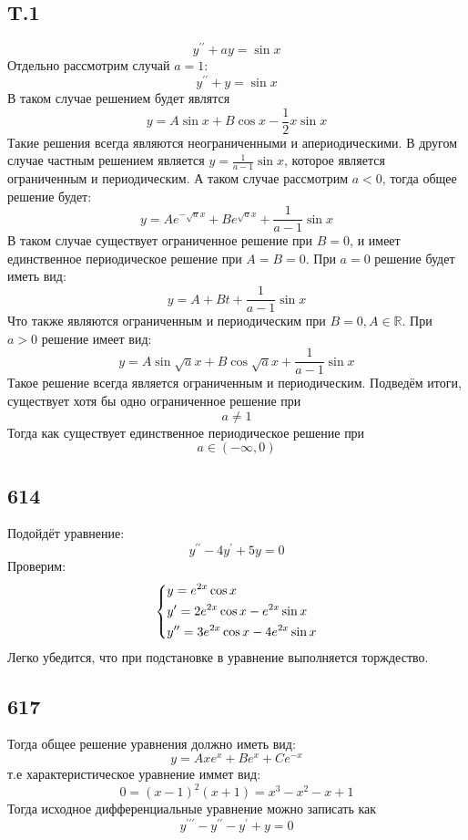 \documentclass[12pt]{article}
\begin{document}
\subsection*{T.1}
\[
    y^{\prime\prime} + ay = \sin x
\]
Отдельно рассмотрим случай $a = 1$: 
\[
    y^{\prime\prime} + y = \sin x
\]
В таком случае решением будет являтся 
\[
    y = A\sin x + B\cos x - \frac{1}{2} x \sin x
\] 
Такие решения всегда являются неограниченными и апериодическими. 
В другом случае частным решением является $y = \frac{1}{a - 1} \sin x$, 
которое является ограниченным и периодическим.
А таком случае рассмотрим $a < 0$, тогда общее решение будет: 
\[
    y = A e^{-\sqrt{a} x} + B e^{\sqrt{a} x} + \frac{1}{a - 1} \sin x
\]    
В таком случае существует ограниченное решение при $B = 0$, и имеет единственное периодическое решение при $A = B = 0$. 
При $a = 0$ решение будет иметь вид: 
\[
    y = A + Bt + \frac{1}{a - 1} \sin x
\]
Что также являются ограниченным и периодическим при $B = 0, A \in \mathbb{R}$. 
При $a > 0$ решение имеет вид: 
\[
    y = A \sin \sqrt{a} x + B \cos \sqrt{a} x + \frac{1}{a - 1} \sin x 
\]  
Такое решение всегда является ограниченным и периодическим. 
Подведём итоги, существует хотя бы одно ограниченное решение при
\[
    a \neq 1
\] 
Тогда как существует единственное периодическое решение при 
\[
    a \in (-\infty, 0)
\]

\subsection*{614}
Подойдёт уравнение: 
\[
    y^{\prime\prime} - 4y^{\prime}  + 5y = 0
\]
Проверим:
\[
    \begin{dcases}
        y = e^{2x}\cos x \\
        y^{\prime} = 2e^{2x}\cos x - e^{2x} \sin x \\
        y^{\prime\prime} = 3e^{2x}\cos x - 4e^{2x} \sin x  
    \end{dcases}
\]
Легко убедится, что при подстановке в уравнение выполняется торждество.

\subsection*{617}
Тогда общее решение уравнения должно иметь вид: 
\[
    y = A x e^x + B e^x + C e^{-x} 
\]
т.е характеристическое уравнение иммет вид: 
\[
    0 = (x - 1)^2 (x + 1) = x^3 - x^2 - x + 1
\]
Тогда исходное дифференциальные уравнение можно записать как 
\[
    y^{\prime\prime\prime} - y^{\prime\prime} - y^{\prime} + y = 0
\]
\end{document}
